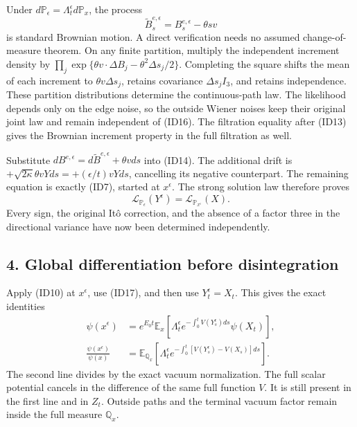 \documentclass[11pt]{article}
\begin{document}
Under \(d\mathbb P_\epsilon=\Lambda_t^\epsilon d\mathbb P_x\), the process
\[
 \widetilde B_s^{e,\epsilon}=B_s^{e,\epsilon}-\theta sv
 \tag{ID16}
\]
is standard Brownian motion. A direct verification needs no assumed change-of-measure theorem. On any finite partition, multiply the independent increment density by \(\prod_j\exp\{\theta v\cdot\Delta B_j-\theta^2\Delta s_j/2\}\). Completing the square shifts the mean of each increment to \(\theta v\Delta s_j\), retains covariance \(\Delta s_jI_3\), and retains independence. These partition distributions determine the continuous-path law. The likelihood depends only on the edge noise, so the outside Wiener noises keep their original joint law and remain independent of (ID16). The filtration equality after (ID13) gives the Brownian increment property in the full filtration as well.

Substitute \(dB^{e,\epsilon}=d\widetilde B^{e,\epsilon}+\theta vds\) into (ID14). The additional drift is \(+\sqrt{2\kappa}\theta vYds=+(\epsilon/t)vYds\), cancelling its negative counterpart. The remaining equation is exactly (ID7), started at \(x^\epsilon\). The strong solution law therefore proves
\[
 \mathcal L_{\mathbb P_\epsilon}(Y^\epsilon)
                  =\mathcal L_{\mathbb P_{x^\epsilon}}(X).
 \tag{ID17}
\]
Every sign, the original Itô correction, and the absence of a factor three in the directional variance have now been determined independently.

\subsection*{4. Global differentiation before disintegration}

Apply (ID10) at \(x^\epsilon\), use (ID17), and then use \(Y_t^\epsilon=X_t\). This gives the exact identities
\[
 \begin{aligned}
 \psi(x^\epsilon)&=e^{E_0t}\mathbb E_x[\Lambda_t^\epsilon
                  e^{-\int_0^tV(Y_s^\epsilon)ds}\psi(X_t)],\\
 \frac{\psi(x^\epsilon)}{\psi(x)}
 &=\mathbb E_{\mathbb Q_x}\left[\Lambda_t^\epsilon
             e^{-\int_0^t[V(Y_s^\epsilon)-V(X_s)]ds}\right].
 \end{aligned}\tag{ID18}
\]
The second line divides by the exact vacuum normalization. The full scalar potential cancels in the difference of the same full function \(V\). It is still present in the first line and in \(Z_t\). Outside paths and the terminal vacuum factor remain inside the full measure \(\mathbb Q_x\).
\end{document}
